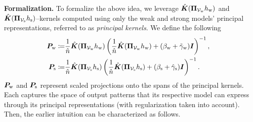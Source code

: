 \textbf{Formalization.} To formalize the above idea, we leverage $\hat{{\bm{K}}}({\bm{\Pi}}_{{\mathcal{V}}_{\text{w}}}h_{\text{w}})$ and $\hat{{\bm{K}}}({\bm{\Pi}}_{{\mathcal{V}}_{\text{s}}}h_{\text{s}})$--kernels computed using only the weak and strong models' principal representations, referred to as \emph{principal kernels}. We define the following 
\begin{align}
\nonumber
        {\bm{P}}_{\text{w}} \coloneqq & \frac{1}{\hat{n}}\hat{{\bm{K}}}({\bm{\Pi}}_{{\mathcal{V}}_{\text{w}}}h_{\text{w}}) \left(\frac{1}{\hat{n}}\hat{{\bm{K}}}({\bm{\Pi}}_{{\mathcal{V}}_{\text{w}}}h_{\text{w}})+(\beta_{\text{w}}+\tilde{\gamma}_{\text{w}}){\bm{I}}\right)^{-1},\\
\nonumber
    {\bm{P}}_{\text{s}} \coloneqq & \frac{1}{\hat{n}}\hat{{\bm{K}}}({\bm{\Pi}}_{{\mathcal{V}}_{\text{s}}}h_{\text{s}}) \left(\frac{1}{\hat{n}}\hat{{\bm{K}}}({\bm{\Pi}}_{{\mathcal{V}}_{\text{s}}}h_{\text{s}})+(\beta_{\text{s}}+\hat{\gamma}_{\text{s}}){\bm{I}}\right)^{-1}.
\end{align} 
${\bm{P}}_{\text{w}}$ and ${\bm{P}}_{\text{s}}$
represent scaled projections onto the spans of the principal kernels. Each captures the space of output patterns that its respective model can express through its principal representations (with regularization taken into account). Then, the earlier intuition can be characterized as follows.



